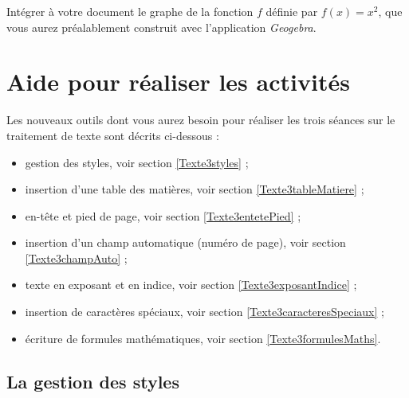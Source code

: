 Intégrer à votre document le graphe de la fonction $f$ définie par $f(x)=x^2$, que vous aurez préalablement construit avec l'application \emph{Geogebra}.

\vfill



\newpage



\section{Aide pour réaliser les activités}\label{aide_seancesWord3}


Les nouveaux outils dont vous aurez besoin pour réaliser les trois séances sur le traitement de texte sont décrits ci-dessous :


\begin{itemize}   
\item gestion des styles, voir section \vref{Texte3styles} ;
\item insertion d'une table des matières, voir section \vref{Texte3tableMatiere} ;
\item en-tête et pied de page, voir section \vref{Texte3entetePied} ;
\item insertion d'un champ automatique (numéro de page), voir section \vref{Texte3champAuto} ;
\item texte en exposant et en indice, voir section \vref{Texte3exposantIndice} ;
\item insertion de caractères spéciaux, voir section \vref{Texte3caracteresSpeciaux} ; 
\item écriture de formules mathématiques, voir section \vref{Texte3formulesMaths}. 
\end{itemize}  




\subsection{La gestion des styles}\label{Texte3styles}

